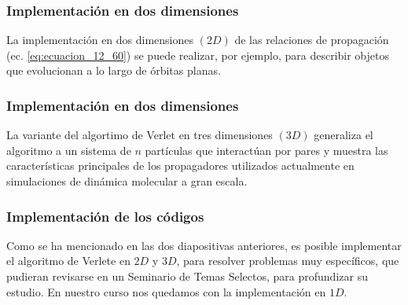 \begin{frame}
\frametitle{Implementación en dos dimensiones}
La implementación en dos dimensiones $(2D)$ de las relaciones de propagación (ec. \ref{eq:ecuacion_12_60}) se puede realizar, por ejemplo, para describir objetos que evolucionan a lo largo de órbitas planas.
\end{frame}
\begin{frame}
\frametitle{Implementación en dos dimensiones}
La variante del algortimo de Verlet en tres dimensiones $(3D)$ generaliza el algoritmo a un sistema de $n$ partículas que interactúan por pares y muestra las características principales de los propagadores utilizados actualmente en simulaciones de dinámica molecular a gran escala.
\end{frame}
\begin{frame}
\frametitle{Implementación de los códigos}
Como se ha mencionado en las dos diapositivas anteriores, es posible implementar el algoritmo de Verlete en $2D$ y $3D$, para resolver problemas muy específicos, que pudieran revisarse en un Seminario de Temas Selectos, para profundizar su estudio. En nuestro curso nos quedamos con la implementación en $1D$.
\end{frame}
